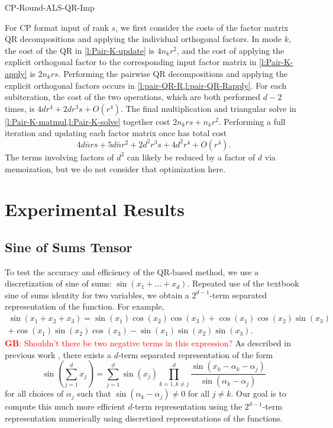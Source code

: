 \documentclass{article}
\newcommand{\GB}[1]{\textcolor{red}{\textbf{GB}: #1}}
\begin{document}
\begin{algorithm}
  \caption{CP-Round-ALS-QR-Imp}
  \label{alg:cp-als-pairwise-qr-kruskal}
  
\end{algorithm}


For CP format input of rank $s$, we first consider the costs of the factor matrix QR decompositions and applying the individual orthogonal factors.
In mode $k$, the cost of the QR in \cref{l:Pair-K-update} is $4n_kr^2$, and the cost of applying the explicit orthogonal factor to the corresponding input factor matrix in \cref{l:Pair-K-apply} is $2n_krs$.
Performing the pairwise QR decompositions and applying the explicit orthogonal factors occurs in \cref{l:pair-QR-R,l:pair-QR-Rapply}.
For each subiteration, the cost of the two operations, which are both performed $d-2$ times, is $4dr^4+2dr^3s+O(r^4)$.
The final multiplication and triangular solve in \cref{l:Pair-K-matmul,l:Pair-K-solve} together cost $2n_krs+n_kr^2$.
Performing a full iteration and updating each factor matrix once has total cost
$$ 4d\bar{n}rs + 5d\bar{n}r^2 + 2d^2r^3s + 4d^2r^4 + O(r^4). $$
The terms involving factors of $d^2$ can likely be reduced by a factor of $d$ via memoization, but we do not consider that optimization here.

\section{Experimental Results} 
\label{sec:result}


\subsection{Sine of Sums Tensor}

To test the accuracy and efficiency of the QR-based method, we use a discretization of sine of sums: $\sin(x_1+\dots+ x_d)$.
Repeated use of the textbook sine of sums identity for two variables, we obtain a $2^{d-1}$-term separated representation of the function.
For example, 
\begin{equation*}
\begin{split}
\sin(x_1+x_2+x_3) = \sin(x_1)\cos(x_2)\cos(x_3)+\cos(x_1)\cos(x_2)\sin(x_3) \\
+\cos(x_1)\sin(x_2)\cos(x_3) - \sin(x_1)\sin(x_2)\sin(x_3).
\end{split}
\end{equation*}
\GB{Shouldn't there be two negative terms in this expression?}
As described in previous work \cite{BM02,MVLB23}, there exists a $d$-term separated representation of the form
$$\sin\left(\sum^d_{j=1}x_j\right) = \sum^d_{j=1}\sin(x_j)\prod^d_{k=1,k\neq j}\frac{\sin(x_k - \alpha_k -\alpha_j)}{\sin(\alpha_k - \alpha_j)}$$
for all choices of  ${\alpha_j}$ such that $\sin(\alpha_k - \alpha_j) \neq 0$ for all $j \neq k$.
Our goal is to compute this much more efficient $d$-term representation using the $2^{d-1}$-term representation numerically using discretized representations of the functions.
\end{document}
